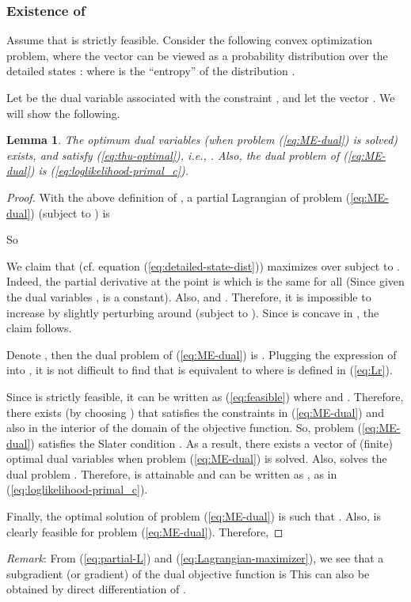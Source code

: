 \documentclass{IEEEtran}
\newtheorem{lemma}{Lemma}
\begin{document}
\subsubsection{\label{sub:attain}Existence of  }

Assume that  is strictly feasible. Consider the following
convex optimization problem, where the vector  can be viewed
as a probability distribution over the detailed states :
where 
is the {}``entropy'' of the distribution .

Let  be the dual variable associated with the constraint ,
and let the vector . We will show the following. 
\begin{lemma}
The optimum dual variables  (when problem (\ref{eq:ME-dual})
is solved) exists, and satisfy (\ref{eq:thu-optimal}), i.e., .
Also, the dual problem of (\ref{eq:ME-dual}) is (\ref{eq:loglikelihood-primal_c}).\end{lemma}
\begin{proof}
With the above definition of , a partial Lagrangian of problem
(\ref{eq:ME-dual}) (subject to )
is


So


We claim that 
 (cf. equation (\ref{eq:detailed-state-dist})) maximizes 
over  subject to .
Indeed, the partial derivative at the point  is
which is the same for all  (Since given the dual
variables ,  is a constant). Also, 
and . Therefore, it
is impossible to increase  by slightly
perturbing  around  (subject to ).
Since  is concave in , the claim
follows. 

Denote , then
the dual problem of (\ref{eq:ME-dual}) is .
Plugging the expression of  into ,
it is not difficult to find that  is equivalent
to  where 
is defined in (\ref{eq:Lr}).

Since  is strictly feasible, it can be written as
(\ref{eq:feasible}) where 
and . Therefore, there exists 
(by choosing ) that satisfies the constraints
in (\ref{eq:ME-dual}) and also in the interior of the domain of the
objective function. So, problem (\ref{eq:ME-dual}) satisfies the
Slater condition \cite{convex-book}. As a result, there exists a
vector of (finite) optimal dual variables  when problem
(\ref{eq:ME-dual}) is solved. Also,  solves the dual
problem . Therefore, 
is attainable and can be written as ,
as in (\ref{eq:loglikelihood-primal_c}).

Finally, the optimal solution  of problem (\ref{eq:ME-dual})
is such that .
Also,  is clearly feasible for problem (\ref{eq:ME-dual}).
Therefore, 

\end{proof}
\emph{Remark}: From (\ref{eq:partial-L}) and (\ref{eq:Lagrangian-maximizer}),
we see that a subgradient (or gradient) of the dual objective function
 is 
This can also be obtained by direct differentiation of .
\end{document}
